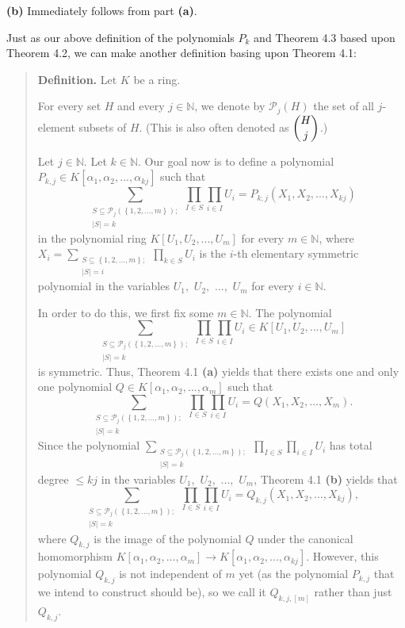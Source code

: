 \documentclass[12pt,final,notitlepage,onecolumn,german]{article}%
\begin{document}
\textbf{(b)} Immediately follows from part \textbf{(a)}.

Just as our above definition of the polynomials $P_{k}$ and Theorem 4.3 based
upon Theorem 4.2, we can make another definition basing upon Theorem 4.1:

\begin{quote}
\textbf{Definition.} Let $K$ be a ring.

For every set $H$ and every $j\in\mathbb{N}$, we denote by $\mathcal{P}%
_{j}\left(  H\right)  $ the set of all $j$-element subsets of $H.$ (This is
also often denoted as $\dbinom{H}{j}$.)

Let $j\in\mathbb{N}$. Let $k\in\mathbb{N}$. Our goal now is to define a
polynomial $P_{k,j}\in K\left[  \alpha_{1},\alpha_{2},...,\alpha_{kj}\right]
$ such that%
\begin{equation}
\sum_{\substack{S\subseteq\mathcal{P}_{j}\left(  \left\{  1,2,...,m\right\}
\right)  ;\\\left\vert S\right\vert =k}}\prod_{I\in S}\prod_{i\in I}%
U_{i}=P_{k,j}\left(  X_{1},X_{2},...,X_{kj}\right)  \label{Pkj1}%
\end{equation}
in the polynomial ring $K\left[  U_{1},U_{2},...,U_{m}\right]  $ for every
$m\in\mathbb{N}$, where $X_{i}=\sum\limits_{\substack{S\subseteq\left\{
1,2,...,m\right\}  ;\\\left\vert S\right\vert =i}}\prod\limits_{k\in S}U_{i}$
is the $i$-th elementary symmetric polynomial in the variables $U_{1},$
$U_{2},$ $...,$ $U_{m}$ for every $i\in\mathbb{N}$.

In order to do this, we first fix some $m\in\mathbb{N}$. The polynomial%
\[
\sum_{\substack{S\subseteq\mathcal{P}_{j}\left(  \left\{  1,2,...,m\right\}
\right)  ;\\\left\vert S\right\vert =k}}\prod_{I\in S}\prod_{i\in I}U_{i}\in
K\left[  U_{1},U_{2},...,U_{m}\right]
\]
is symmetric. Thus, Theorem 4.1 \textbf{(a)} yields that there exists one and
only one polynomial $Q\in K\left[  \alpha_{1},\alpha_{2},...,\alpha
_{m}\right]  $ such that%
\[
\sum_{\substack{S\subseteq\mathcal{P}_{j}\left(  \left\{  1,2,...,m\right\}
\right)  ;\\\left\vert S\right\vert =k}}\prod_{I\in S}\prod_{i\in I}%
U_{i}=Q\left(  X_{1},X_{2},...,X_{m}\right)  .
\]
Since the polynomial $\sum\limits_{\substack{S\subseteq\mathcal{P}_{j}\left(
\left\{  1,2,...,m\right\}  \right)  ;\\\left\vert S\right\vert =k}%
}\prod\limits_{I\in S}\prod\limits_{i\in I}U_{i}$ has total degree $\leq kj$
in the variables $U_{1},$ $U_{2},$ $...,$ $U_{m}$, Theorem 4.1 \textbf{(b)}
yields that%
\[
\sum_{\substack{S\subseteq\mathcal{P}_{j}\left(  \left\{  1,2,...,m\right\}
\right)  ;\\\left\vert S\right\vert =k}}\prod_{I\in S}\prod_{i\in I}%
U_{i}=Q_{k,j}\left(  X_{1},X_{2},...,X_{kj}\right)  ,
\]
where $Q_{k,j}$ is the image of the polynomial $Q$ under the canonical
homomorphism $K\left[  \alpha_{1},\alpha_{2},...,\alpha_{m}\right]
\rightarrow K\left[  \alpha_{1},\alpha_{2},...,\alpha_{kj}\right]  $. However,
this polynomial $Q_{k,j}$ is not independent of $m$ yet (as the polynomial
$P_{k,j}$ that we intend to construct should be), so we call it
$Q_{k,j,\left[  m\right]  }$ rather than just $Q_{k,j}$.


\end{quote}
\end{document}
